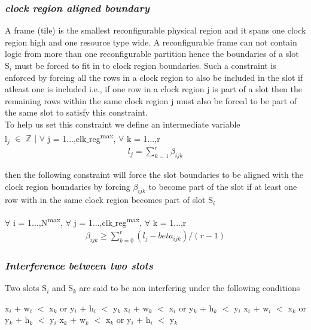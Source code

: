 \subsubsection*{\textit {clock region aligned boundary}}  
A frame (tile) is the smallest reconfigurable physical region and it spans one clock region high and one resource type wide. A reconfigurable frame can not contain logic from more than one reconfigurable partition hence the boundaries of a slot S$_i$ must be forced to fit in to clock region boundaries. 
Such a constraint is enforced by forcing all the rows in a clock region to also be included in the slot if atleast one is included i.e., if one row in a clock region j is part of a slot then the remaining rows within the same clock region j must also be forced to be part of the same slot to satisfy this constraint. \\
To help us set this constraint we define an intermediate variable \\
l$_{j}$  $\in$ $\mathbb{Z}$ $\mid$ $\forall$ j = 1...,clk$\_$reg\textsuperscript{max}, $\forall$ k = 1...,r
\begin{equation}
\begin{split}
l_j = \sum_{k=1}^{r} \beta_{ijk}
\end{split}
\end{equation}

then the following constraint will force the slot boundaries to be aligned with the clock region boundaries by forcing $\beta_{ijk}$ to become part of the slot if at least one row with in the same clock region becomes part of slot S$_i$

\begin{constraint}  $\forall$ i = 1...,N\textsuperscript{max}, $\forall$ j = 1...,clk$\_$reg\textsuperscript{max}, $\forall$ k = 1...,r
\begin{equation}
\begin{split}
\beta_{ijk} \geq \sum_{k=0}^{r}  (l_j - beta_{ijk}) / (r - 1)
\end{split}
\end{equation}
\end{constraint}

\subsubsection*{\textit {Interference between two slots}}
Two slots S$_i$ and S$_k$ are said to be non interfering under the following conditions
\begin{algorithmic}
	\STATE x$_i$ + w$_i$ $<$ x$_k$ or y$_i$ + h$_i$ $<$ y$_k$
	\STATE x$_i$ + w$_k$ $<$ x$_i$ or y$_k$ + h$_k$ $<$ y$_i$
	\STATE x$_i$ + w$_i$ $<$ x$_k$ or y$_k$ + h$_k$ $<$ y$_i$
\ELSE
	\STATE x$_k$ + w$_k$ $<$ x$_k$ or y$_i$ + h$_i$ $<$ y$_k$
\ENDIF
\end{algorithmic}

